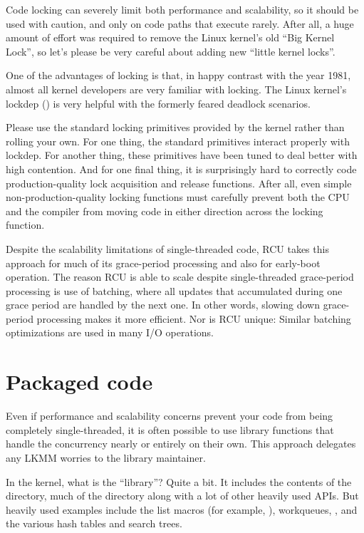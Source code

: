 Code locking can severely limit both performance and scalability, so it
should be used with caution, and only on code paths that execute rarely.
After all, a huge amount of effort was required to remove the Linux
kernel's old ``Big Kernel Lock'', so let's please be very careful about
adding new ``little kernel locks''.

One of the advantages of locking is that, in happy contrast with the
year 1981, almost all kernel developers are very familiar with locking.
The Linux kernel's lockdep () is very helpful with
the formerly feared deadlock scenarios.

Please use the standard locking primitives provided by the kernel rather
than rolling your own.
For one thing, the standard primitives interact properly with lockdep.
For another thing, these primitives have been tuned to deal better
with high contention.
And for one final thing, it is surprisingly hard to correctly code
production-quality lock acquisition and release functions.
After all, even simple non-production-quality locking functions must
carefully prevent both the CPU and the compiler from moving code in
either direction across the locking function.

Despite the scalability limitations of single-threaded code, RCU
takes this approach for much of its grace-period processing and also
for early-boot operation.
The reason RCU is able to scale despite single-threaded grace-period
processing is use of batching, where all updates that accumulated
during one grace period are handled by the next one.
In other words, slowing down grace-period processing makes it more
efficient.
Nor is RCU unique:
Similar batching optimizations are used in many I/O operations.


\section{Packaged code}

Even if performance and scalability concerns prevent your code from
being completely single-threaded, it is often possible to use library
functions that handle the concurrency nearly or entirely on their own.
This approach delegates any LKMM worries to the library maintainer.

In the kernel, what is the ``library''?
Quite a bit.
It includes the contents of the  directory, much of the
 directory along with a lot of other heavily
used APIs.
But heavily used examples include the list macros (for example,
), workqueues,
, and the various hash tables and search trees.


